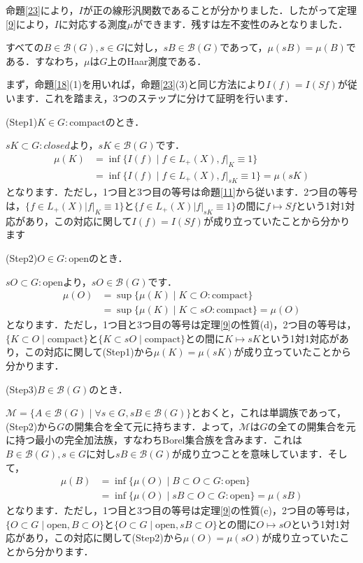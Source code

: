 命題\ref{23}により，$I$が正の線形汎関数であることが分かりました．したがって定理\ref{9}により，$I$に対応する測度$\mu$ができます．残すは左不変性のみとなりました．

\begin{yprop}\label{25}
すべての$B \in \mathscr{B}(G), s \in G$に対し，$sB \in \mathscr{B}(G)$であって，$\mu(sB)=\mu(B)$である．すなわち，$\mu$は$G$上のHaar測度である．
\end{yprop}
\begin{Proof}
まず，命題\ref{18}(1)を用いれば，命題\ref{23}(3)と同じ方法により$I(f)=I(Sf)$が従います．これを踏まえ，3つのステップに分けて証明を行います．

(Step1)$K \in G \colon \mathrm{compact}$のとき．

$sK \subset G \colon closed$より，$sK \in  \mathscr{B}(G)$です．
\begin{align*}
\mu(K) & = \inf \{ I(f) \mid f \in L_{+}(X), f|_{K} \equiv 1 \} \\
 & =\inf \{ I(f) \mid f \in L_{+}(X), f|_{sK} \equiv 1 \}=\mu(sK)
\end{align*}
となります．ただし，1つ目と3つ目の等号は命題\ref{11}から従います．2つ目の等号は，$\{ f \in L_{+}(X) | f|_{K} \equiv 1 \}$と$\{ f \in L_{+}(X) | f|_{sK} \equiv 1 \}$の間に$f \mapsto Sf$という1対1対応があり，この対応に関して$I(f)=I(Sf)$が成り立っていたことから分かります

(Step2)$O \in G \colon \mathrm{open}$のとき．

$sO \subset G \colon \mathrm{open}$より，$sO \in \mathscr{B}(G)$です．
\begin{align*}
\mu(O) & = \sup \{ \mu(K) \mid K \subset O \colon \mathrm{compact} \} \\
 & =\sup \{ \mu(K) \mid K \subset sO \colon \mathrm{compact} \} = \mu (O)
\end{align*}
となります．ただし，1つ目と3つ目の等号は定理\ref{9}の性質(d)，2つ目の等号は，$\{ K \subset O \mid \mathrm{compact} \}$と$\{ K \subset sO \mid \mathrm{compact} \}$との間に$K \mapsto sK$という1対1対応があり，この対応に関して(Step1)から$\mu(K)=\mu(sK)$が成り立っていたことから分かります．

(Step3)$B \in \mathscr{B}(G)$のとき．

$\mathscr{M}=\{A \in \mathscr{B}(G) \mid \forall s \in G , sB \in \mathscr{B}(G) \}$とおくと，これは単調族であって，(Step2)から$G$の開集合を全て元に持ちます．よって，$\mathscr{M}$は$G$の全ての開集合を元に持つ最小の完全加法族，すなわちBorel集合族を含みます．これは$B \in \mathscr{B}(G), s \in G$に対し$ sB \in \mathscr{B}(G)$が成り立つことを意味しています．そして，
\begin{align*}
\mu(B) & = \inf \{ \mu(O) \mid B \subset O \subset G \colon \mathrm{open}\} \\
 & = \inf \{ \mu(O) \mid sB \subset O \subset G \colon \mathrm{open}\} = \mu(sB)
\end{align*}
となります．ただし，1つ目と3つ目の等号は定理\ref{9}の性質(c)，2つ目の等号は，$\{ O \subset G \mid \mathrm{open}, B \subset O \}$と$\{ O \subset G \mid \mathrm{open}, sB \subset O \}$との間に$O \mapsto sO$という1対1対応があり，この対応に関して(Step2)から$\mu(O)=\mu(sO)$が成り立っていたことから分かります．


\end{Proof}
